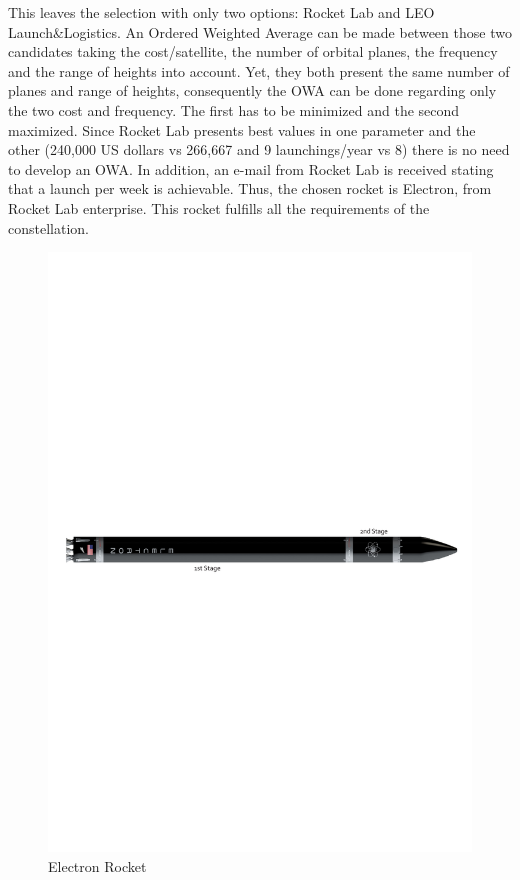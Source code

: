 \newline
This leaves the selection with only two options: Rocket Lab and LEO Launch\&Logistics. An Ordered Weighted Average can be made between those two candidates taking the cost/satellite, the number of orbital planes, the frequency and the range of heights into account. Yet, they both present the same number of planes and range of heights, consequently the OWA can be done regarding only the two cost and frequency. The first has to be minimized and the second maximized. Since Rocket Lab presents best values in one parameter and the other (240,000 US dollars vs 266,667 and 9 launchings/year vs 8) there is no need to develop an OWA. In addition, an e-mail from Rocket Lab is received stating that a launch per week is achievable. Thus, the chosen rocket is Electron, from Rocket Lab enterprise. This rocket fulfills all the requirements of the constellation. 
\newline
\begin{figure}[h!]
\centering 
\includegraphics[scale=0.7]{./sections/Constellation_Deployment/S2-Launcher/Images_S2/Picture_1_S2.pdf} 
\caption{Electron Rocket}
\label{fig:rocket}
\end{figure}
\newline
